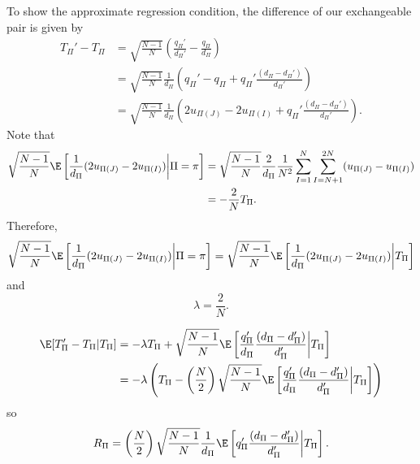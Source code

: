 To show the approximate regression condition, the difference of our exchangeable pair is given by
\begin{align}
  T_{\Pi}' - T_{\Pi}
  &= \sqrt{\frac{N-1}{N}}\left (\frac{q_{\Pi}'}{d_{\Pi}'}-\frac{q_{\Pi}}{d_{\Pi}}\right )
  \nonumber \\
  &= \sqrt{\frac{N-1}{N}}\frac{1}{d_{\Pi}}\left (q_{\Pi}' - q_{\Pi} +
    q_{\Pi}' \frac{(d_{\Pi}-d_{\Pi}')}{d_{\Pi}'}\right ) \nonumber \\
  &= \sqrt{\frac{N-1}{N}}\frac{1}{d_{\Pi}}\left
    (2u_{\Pi(J)} - 2u_{\Pi(I)} + q_{\Pi}' \frac{(d_{\Pi}-d_{\Pi}')}{d_{\Pi}'}\right ). \label{def:ttpcubed}
\end{align}
Note that
\begin{align*}
  \sqrt{\frac{N-1}{N}} \E \left [ \frac{1}{d_{\Pi}} (2u_{\Pi(J)} - 2u_{\Pi(I)}) \middle | \Pi = \pi \right ]
  &= \sqrt{\frac{N-1}{N}} \frac{2}{d_{\Pi}} \frac{1}{N^2} \sum_{I=1}^N \sum_{I=N+1}^{2N} (u_{\Pi(J)}-u_{\Pi(I)}) \\
  &= -\frac{2}{N} T_{\Pi}.
\end{align*}
Therefore,
\begin{equation*}
  \sqrt{\frac{N-1}{N}} \E \left [ \frac{1}{d_{\Pi}} (2u_{\Pi(J)} - 2u_{\Pi(I)}) \middle | \Pi = \pi \right ]
  = \sqrt{\frac{N-1}{N}} \E \left [ \frac{1}{d_{\Pi}} (2u_{\Pi(J)} - 2u_{\Pi(I)}) \middle | T_{\Pi} \right ]
\end{equation*}
and
\begin{equation*}
  \lambda = \frac{2}{N}.
\end{equation*}

\begin{align*}
  \E[T_{\Pi}'-T_{\Pi}|T_{\Pi}]
  &= - \lambda T_{\Pi} + \sqrt{\frac{N-1}{N}}
  \E\left [\frac{q_{\Pi}'}{d_{\Pi}} \frac{(d_{\Pi}-d_{\Pi}')}{d_{\Pi}'}\middle |T_{\Pi} \right ] \\
  &= - \lambda \left ( T_{\Pi} - \left ( \frac{N}{2} \right )
    \sqrt{\frac{N-1}{N}}
    \E\left [\frac{q_{\Pi}'}{d_{\Pi}} \frac{(d_{\Pi}-d_{\Pi}')}{d_{\Pi}'}\middle |T_{\Pi} \right ] \right )
\end{align*}
so
\begin{equation}
  \label{def:Rdef}
  R_{\Pi} = \left (\frac{N}{2}\right )\sqrt{\frac{N-1}{N}}\frac{1}{d_{\Pi}}\E
  \left [q_{\Pi}'\frac{(d_{\Pi}-d_{\Pi}')}{d_{\Pi}'} \middle | T_{\Pi} \right ].
\end{equation}


